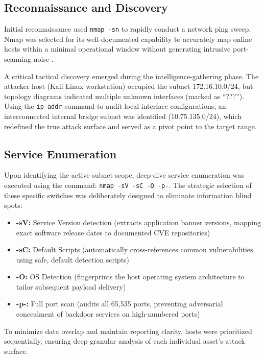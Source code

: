 \documentclass[11pt,a4paper]{article}
\begin{document}
\subsection{Reconnaissance and Discovery}

Initial reconnaissance used \texttt{nmap -sn} to rapidly conduct a network ping sweep. Nmap was selected for its well-documented capability to accurately map online hosts within a minimal operational window without generating intrusive port-scanning noise \citep{Lyon2009}.

A critical tactical discovery emerged during the intelligence-gathering phase. The attacker host (Kali Linux workstation) occupied the subnet 172.16.10.0/24, but topology diagrams indicated multiple unknown interfaces (marked as ``???''). Using the \texttt{ip addr} command to audit local interface configurations, an interconnected internal bridge subnet was identified (10.75.135.0/24), which redefined the true attack surface and served as a pivot point to the target range.

\subsection{Service Enumeration}

Upon identifying the active subnet scope, deep-dive service enumeration was executed using the command: \texttt{nmap -sV -sC -O -p-}. The strategic selection of these specific switches was deliberately designed to eliminate information blind spots:

\begin{itemize}
    \item \textbf{-sV:} Service Version detection (extracts application banner versions, mapping exact software release dates to documented CVE repositories)
    \item \textbf{-sC:} Default Scripts (automatically cross-references common vulnerabilities using safe, default detection scripts)
    \item \textbf{-O:} OS Detection (fingerprints the host operating system architecture to tailor subsequent payload delivery)
    \item \textbf{-p-:} Full port scan (audits all 65,535 ports, preventing adversarial concealment of backdoor services on high-numbered ports)
\end{itemize}

To minimize data overlap and maintain reporting clarity, hosts were prioritized sequentially, ensuring deep granular analysis of each individual asset's attack surface.
\end{document}
